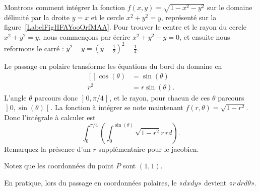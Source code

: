 \begin{example}     \label{ExpmfDtAtV}
	Montrons comment intégrer la fonction \( f(x,y)=\sqrt{1-x^2-y^2}\) sur le domaine délimité par la droite \( y=x\) et le cercle \( x^2+y^2=y\), représenté sur la figure~\ref{LabelFigHFAYooOrfMAA}. Pour trouver le centre et le rayon du cercle \( x^2+y^2=y\), nous commençons par écrire \( x^2+y^2-y=0\), et ensuite nous reformons le carré : \( y^2-y=(y-\frac{ 1 }{2})^2-\frac{1}{ 4 }\).

	\newcommand{\CaptionFigHFAYooOrfMAA}{Passage en polaire pour intégrer sur un morceau de cercle.}
	

	Le passage en polaire transforme les équations du bord du domaine en
	\begin{equation}
		\begin{aligned}[]
			\cos(\theta) & =\sin(\theta)   \\
			r^2          & =r\sin(\theta).
		\end{aligned}
	\end{equation}
	L'angle \( \theta\) parcours donc \( \mathopen] 0 , \pi/4 \mathclose[\), et le rayon, pour chacun de ces \( \theta\) parcours \( \mathopen] 0 , \sin(\theta) \mathclose[\). La fonction à intégrer se note maintenant \( f(r,\theta)=\sqrt{1-r^2}\). Donc l'intégrale à calculer est
	\begin{equation}		\label{PgOMRapIntMultFubiniBoutCercle}
		\int_{0}^{\pi/4}\left( \int_0^{\sin(\theta)}\sqrt{1-r^2}r\,rd \right).
	\end{equation}
	Remarquez la présence d'un \( r\) supplémentaire pour le jacobien.

	Notez que les coordonnées du point \( P\) sont \( (1,1)\).
\end{example}

En pratique, lors du passage en coordonnées polaires, le «\( dxdy\)» devient «\( r\,drd\theta\)».

